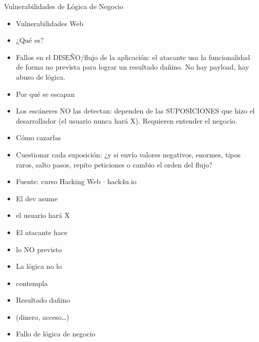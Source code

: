 \documentclass[aspectratio=169,10pt]{beamer}
\begin{document}
\begin{frame}[allowframebreaks]{Vulnerabilidades de Lógica de Negocio}
\small
  \begin{itemize}
  \item Vulnerabilidades Web
  \item ¿Qué es?
  \item Fallos en el DISEÑO/flujo de la aplicación: el atacante usa la funcionalidad de forma no prevista para lograr un resultado dañino. No hay payload, hay abuso de lógica.
  \item Por qué se escapan
  \item Los escáneres NO las detectan: dependen de las SUPOSICIONES que hizo el desarrollador (el usuario nunca hará X). Requieren entender el negocio.
  \item Cómo cazarlas
  \item Cuestionar cada suposición: ¿y si envío valores negativos, enormes, tipos raros, salto pasos, repito peticiones o cambio el orden del flujo?
  \item Fuente: curso Hacking Web $\cdot$ hack4u.io
  \item El dev asume
  \item el usuario hará X
  \item El atacante hace
  \item lo NO previsto
  \item La lógica no lo
  \item contempla
  \item Resultado dañino
  \item (dinero, acceso\dots{})
  \item Fallo de lógica de negocio
  \end{itemize}
\end{frame}
\end{document}

